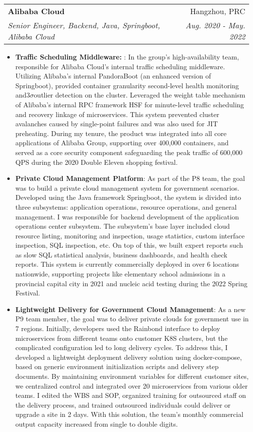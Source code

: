 \documentclass[letterpaper,11pt]{article}
\makeatletter
\newcommand{\resumeItem}[2]{
	\item\small{
		\textbf{#1}{: #2 \vspace{-2pt}}
	}
}
\newcommand{\resumeSubheading}[4]{
	\vspace{-1pt}\item
	\begin{tabular*}{0.97\textwidth}[t]{l@{\extracolsep{\fill}}r}
		\textbf{#1} & #2 \\
		\textit{\small#3} & \textit{\small #4} \\
	\end{tabular*}\vspace{-5pt}
}
\newcommand{\resumeItemListStart}{\begin{itemize}}
\newcommand{\resumeItemListEnd}{\end{itemize}\vspace{-5pt}}
\makeatother
\begin{document}
\begin{spacing}{1.0}
	\resumeSubheading
	{Alibaba Cloud}{Hangzhou, PRC}
	{Senior Engineer, Backend, Java, Springboot, Alibaba Cloud}{Aug. 2020 - May. 2022}
	\resumeItemListStart
	\resumeItem{Traffic Scheduling Middleware: }
	{In the group's high-availability team, responsible for Alibaba Cloud's internal traffic scheduling middleware. Utilizing Alibaba's internal PandoraBoot (an enhanced version of Springboot), provided container granularity second-level health monitoring and$3\sigma$outlier detection on the cluster. Leveraged the weight table mechanism of Alibaba's internal RPC framework HSF for minute-level traffic scheduling and recovery linkage of microservices. This system prevented cluster avalanches caused by single-point failures and was also used for JIT preheating. During my tenure, the product was integrated into all core applications of Alibaba Group, supporting over 400,000 containers, and served as a core security component safeguarding the peak traffic of 600,000 QPS during the 2020 Double Eleven shopping festival.}
	\resumeItem{Private Cloud Management Platform}
	{As part of the P8 team, the goal was to build a private cloud management system for government scenarios. Developed using the Java framework Springboot, the system is divided into three subsystems: application operations, resource operations, and general management. I was responsible for backend development of the application operations center subsystem. The subsystem’s base layer included cloud resource listing, monitoring and inspection, usage statistics, custom interface inspection, SQL inspection, etc. On top of this, we built expert reports such as slow SQL statistical analysis, business dashboards, and health check reports. This system is currently commercially deployed in over 6 locations nationwide, supporting projects like elementary school admissions in a provincial capital city in 2021 and nucleic acid testing during the 2022 Spring Festival.}
	\resumeItem{Lightweight Delivery for Government Cloud Management}
	{As a new P9 team member, the goal was to deliver private clouds for government use in 7 regions. Initially, developers used the Rainbond interface to deploy microservices from different teams onto customer K8S clusters, but the complicated configuration led to long delivery cycles. To address this, I developed a lightweight deployment delivery solution using docker-compose, based on generic environment initialization scripts and delivery step documents. By maintaining environment variables for different customer sites, we centralized control and integrated over 20 microservices from various older teams. I edited the WBS and SOP, organized training for outsourced staff on the delivery process, and trained outsourced individuals could deliver or upgrade a site in 2 days. With this solution, the team’s monthly commercial output capacity increased from single to double digits.}
	\resumeItemListEnd
	

\end{spacing}
\end{document}
